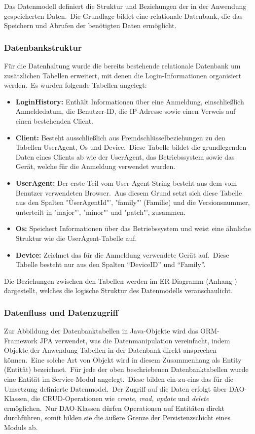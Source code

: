 Das Datenmodell definiert die Struktur und Beziehungen der in der Anwendung gespeicherten Daten.\ Die Grundlage bildet eine relationale Datenbank, die das Speichern und Abrufen der benötigten Daten ermöglicht.

\subsubsection{Datenbankstruktur}

Für die Datenhaltung wurde die bereits bestehende relationale Datenbank um zusätzlichen Tabellen erweitert, mit denen die Login-Informationen organisiert werden.\ Es wurden folgende Tabellen angelegt:

\begin{itemize}
	\item \textbf{LoginHistory:} Enthält Informationen über eine Anmeldung, einschließlich Anmeldedatum, die Benutzer-ID, die IP-Adresse sowie einen Verweis auf einen bestehenden Client.
	\item \textbf{Client:} Besteht ausschließlich aus Fremdschlüsselbeziehungen zu den Tabellen UserAgent, Os und Device.\ Diese Tabelle bildet die grundlegenden Daten eines Clients ab wie der UserAgent, das Betriebssystem sowie das Gerät, welche für die Anmeldung verwendet wurden.
	\item \textbf{UserAgent:} Der erste Teil vom User-Agent-String besteht aus dem vom Benutzer verwendeten Browser.\ Aus diesem Grund setzt sich diese Tabelle aus den Spalten "ÙserAgentId"', "family"' (Familie) und die Versionsnummer, unterteilt in "major"', "minor"' und "patch"', zusammen.
	\item \textbf{Os:} Speichert Informationen über das Betriebssystem und weist eine ähnliche Struktur wie die UserAgent-Tabelle auf.
	\item \textbf{Device:} Zeichnet das für die Anmeldung verwendete Gerät auf.\ Diese Tabelle besteht nur aus den Spalten "`DeviceID"' und "`Family"'.
\end{itemize}

Die Beziehungen zwischen den Tabellen werden im ER-Diagramm (Anhang ) dargestellt, welches die logische Struktur des Datenmodells veranschaulicht.

\subsubsection{Datenfluss und Datenzugriff}
Zur Abbildung der Datenbanktabellen in Java-Objekte wird das ORM-Framework JPA verwendet, was die Datenmanipulation vereinfacht, indem Objekte der Anwendung Tabellen in der Datenbank direkt ansprechen können.\ Eine solche Art von Objekt wird
in diesem Zusammenhang als Entity (Entität) bezeichnet.\ Für jede der oben beschriebenen Datenbanktabellen wurde eine Entität im Service-Modul angelegt.\ Diese bilden ein-zu-eins das für die Umsetzung definierte Datenmodel.\ Der Zugriff auf die Daten erfolgt über
DAO-Klassen, die CRUD-Operationen wie \textit{create, read, update} und \textit{delete} ermöglichen.\ Nur DAO-Klassen dürfen Operationen auf Entitäten direkt durchführen, somit bilden sie die äußere Grenze der Persistenzschicht eines Moduls ab.

